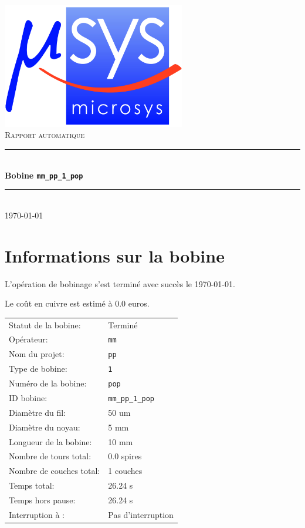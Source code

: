 \documentclass[a4paper, 11pt]{article}
\begin{document}
\begin{titlepage}
\begin{center}
\includegraphics[width=0.6\textwidth]{./sources/microsys.jpg}~ \\[5cm]
\textsc{\LARGE Rapport automatique}\\[1.5cm]
\rule{\linewidth}{0.5mm} \\[0.4cm]
{ \huge \bfseries Bobine \verb?mm_pp_1_pop? \\[0.4cm] }
\rule{\linewidth}{0.5mm} \\[3.5cm]
\textsc{\large \today}\\[0.5cm]
\vfill
\end{center}
\end{titlepage}
\fancyhf{}
\lfoot{\fancyplain{}{\rightmark}}
\rfoot{\fancyplain{}{\thepage}}
\section{Informations sur la bobine}
L'opération de bobinage s'est terminé avec succès le \today.
 
Le coût en cuivre est estimé à 0.0 euros.
 
 
\begin{tabular}{ll}
Statut de la bobine: & Terminé \\ 
Opérateur: & \verb?mm? \\ 
Nom du projet: & \verb?pp? \\ 
Type de bobine: & \verb?1? \\ 
Numéro de la bobine: & \verb?pop? \\ 
ID bobine: & \verb?mm_pp_1_pop? \\ 
Diamètre du fil: & 50 um \\ 
Diamètre du noyau: & 5 mm \\ 
Longueur de la bobine: & 10 mm \\ 
Nombre de tours total: & 0.0 spires \\ 
Nombre de couches total: & 1 couches \\ 
Temps total: & 26.24 s \\ 
Temps hors pause: & 26.24 s \\ 
Interruption à : & Pas d'interruption \\ 
\end{tabular}
\clearpage
\end{document}
